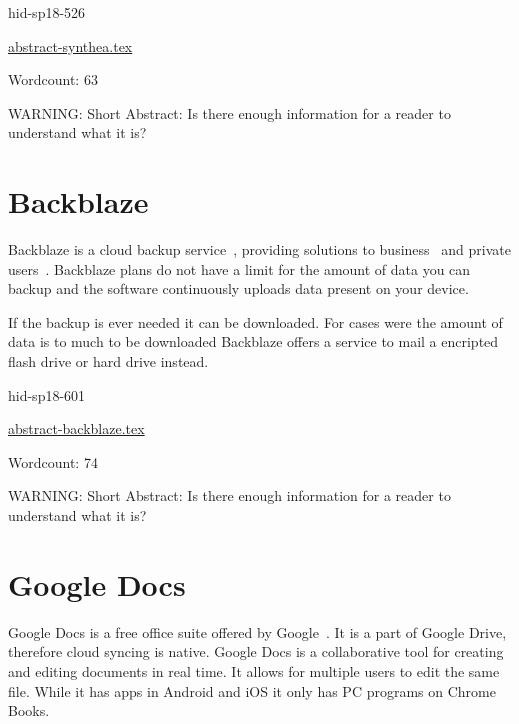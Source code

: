 \begin{IU}

hid-sp18-526

\href{https://github.com/cloudmesh-community/hid-sp18-526/blob/master//technology/abstract-synthea.tex}{abstract-synthea.tex}

 

Wordcount: 63

WARNING: Short Abstract: Is there enough information for a reader to understand what it is?

\end{IU}

\section{Backblaze}

Backblaze is a cloud backup service~\cite{hid-sp18-601-www-bblaze-about}, 
providing solutions to business~\cite{hid-sp18-601-www-bblaze-business} and 
private users~\cite{hid-sp18-601-www-bblaze-personal}. Backblaze plans do not
have a limit for the amount of data you can backup and the software continuously 
uploads data present on your device. 

If the backup is ever needed it can be downloaded. For cases were the amount of 
data is to much to be downloaded Backblaze offers a service to mail a encripted 
flash drive or hard drive instead.

\begin{IU}

hid-sp18-601

\href{https://github.com/cloudmesh-community/hid-sp18-601/blob/master//technology/abstract-backblaze.tex}{abstract-backblaze.tex}

 

Wordcount: 74

WARNING: Short Abstract: Is there enough information for a reader to understand what it is?

\end{IU}

\section{Google Docs}

Google Docs is a free office suite offered by 
Google~\cite{hid-sp18-601-www-gdoc-about}. It is a part of Google 
Drive, therefore cloud syncing is native. Google Docs is a collaborative tool
for creating and editing documents in real time. It allows for multiple users
to edit the same file. While it has apps in Android and iOS it only has PC
programs on Chrome Books.

